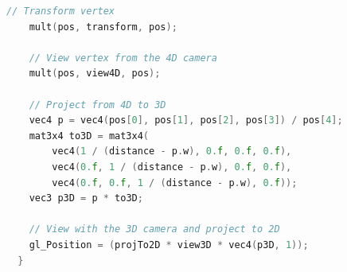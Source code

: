 \documentclass[11pt, a4paper]{article}
\begin{document}
\begin{appendices}
\begin{lstlisting}[language=c++]
    // Transform vertex
    mult(pos, transform, pos);

    // View vertex from the 4D camera
    mult(pos, view4D, pos);

    // Project from 4D to 3D
    vec4 p = vec4(pos[0], pos[1], pos[2], pos[3]) / pos[4];
    mat3x4 to3D = mat3x4(
        vec4(1 / (distance - p.w), 0.f, 0.f, 0.f),
        vec4(0.f, 1 / (distance - p.w), 0.f, 0.f),
        vec4(0.f, 0.f, 1 / (distance - p.w), 0.f));
    vec3 p3D = p * to3D;

    // View with the 3D camera and project to 2D
    gl_Position = (projTo2D * view3D * vec4(p3D, 1));
  }
\end{lstlisting}

\end{appendices}
\end{document}

